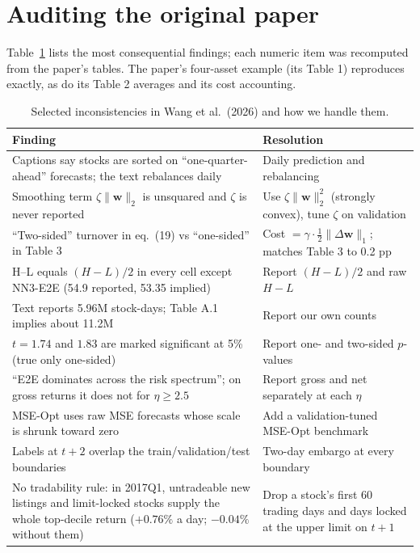 \documentclass[10pt,a4paper]{article}
\newcommand{\w}{\bm w}
\begin{document}
\section{Auditing the original paper}\label{sec:audit}
Table~\ref{tab:audit} lists the most consequential findings; each numeric item was recomputed from the paper's
tables. The paper's four-asset example (its Table 1) reproduces exactly, as do its Table 2 averages and its cost
accounting.

\begin{table}[h]
\centering\scriptsize
\caption{Selected inconsistencies in Wang et al.\ (2026) and how we handle them.}\label{tab:audit}
\begin{tabular}{p{7.4cm}p{8.4cm}}
\toprule
Finding & Resolution \\
\midrule
Captions say stocks are sorted on ``one-quarter-ahead'' forecasts; the text rebalances daily & Daily prediction and rebalancing \\
Smoothing term $\zeta\lVert\w\rVert_2$ is unsquared and $\zeta$ is never reported & Use $\zeta\lVert\w\rVert_2^2$ (strongly convex), tune $\zeta$ on validation \\
``Two-sided'' turnover in eq.\ (19) vs ``one-sided'' in Table 3 & Cost $=\gamma\cdot\frac12\lVert\Delta\w\rVert_1$; matches Table 3 to 0.2 pp \\
H--L equals $(H-L)/2$ in every cell except NN3-E2E (54.9 reported, 53.35 implied) & Report $(H-L)/2$ and raw $H-L$ \\
Text reports 5.96M stock-days; Table A.1 implies about 11.2M & Report our own counts \\
$t=1.74$ and $1.83$ are marked significant at 5\% (true only one-sided) & Report one- and two-sided $p$-values \\
``E2E dominates across the risk spectrum''; on gross returns it does not for $\eta\ge2.5$ & Report gross and net separately at each $\eta$ \\
MSE-Opt uses raw MSE forecasts whose scale is shrunk toward zero & Add a validation-tuned MSE-Opt benchmark \\
Labels at $t{+}2$ overlap the train/validation/test boundaries & Two-day embargo at every boundary \\
No tradability rule: in 2017Q1, untradeable new listings and limit-locked stocks supply the whole top-decile return ($+0.76\%$ a day; $-0.04\%$ without them) & Drop a stock's first 60 trading days and days locked at the upper limit on $t{+}1$ \\
\bottomrule
\end{tabular}
\end{table}
\end{document}
